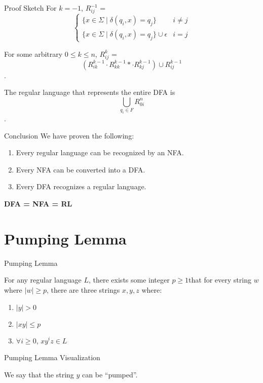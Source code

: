 \documentclass{beamer}
\newcommand{\concat}{\mathbin{\cdot}}
\newcommand{\kstar}{{*}}
\begin{document}
\begin{frame}{Proof Sketch}
For $k=-1$, $R^{-1}_{ij}$ =
\[ \begin{cases} 
      \{x \in \Sigma \mid \delta(q_i,x) = q_j\} & i \neq j \\
      \{x \in \Sigma \mid \delta(q_i,x) = q_j\} \cup \epsilon & i = j
   \end{cases}
\]

For some arbitrary $0 \leq k \leq n$, $R^k_{ij}$ = $$(R^{k-1}_{ik} \concat R^{k-1}_{kk} \kstar \concat R^{k-1}_{kj}) \cup R^{k-1}_{ij}$$.

The regular language that represents the entire DFA is $$\bigcup_{q_i \in F} R^n_{0i}$$.
\end{frame}

\begin{frame}{Conclusion}
We have proven the following:

\begin{enumerate}
\item Every regular language can be recognized by an NFA.
\item Every NFA can be converted into a DFA.
\item Every DFA recognizes a regular language.
\end{enumerate}

\begin{center}
\Huge \textbf{DFA = NFA = RL}
\end{center}
\end{frame}

\section{Pumping Lemma}

\begin{frame}{Pumping Lemma}
\begin{theorem}
For any regular language $L$, there exists some integer $p \geq 1$that for every string $w$ where $|w| \geq p$, there are three strings $x,y,z$ where:
\begin{enumerate}
\item $|y| > 0$
\item $|xy| \leq p$
\item $\forall i \geq 0$, $xy^iz \in L$
\end{enumerate}
\end{theorem}
\end{frame}

\begin{frame}[fragile]{Pumping Lemma Visualization}

We say that the string $y$ can be ``pumped''.
\end{frame}
\end{document}
